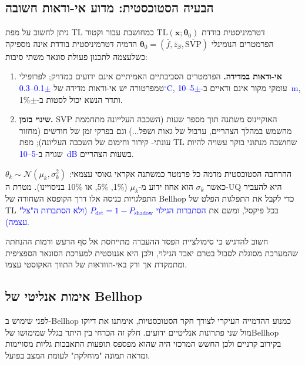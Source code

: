 \documentclass[12pt,a4paper]{article}
\newcommand{\TL}{\mathrm{TL}}
\newcommand{\Pshadow}{P_{\mathrm{shadow}}}
\DeclareRobustCommand{\aiedit}[1]{\textcolor{blue}{#1}}
\begin{document}
\subsection{הבעיה הסטוכסטית: מדוע אי-ודאות חשובה}
\label{sec:stochastic}

ניתן לחשוב על מפת TL דטרמיניסטית בודדת $\TL(\mathbf{x};\boldsymbol{\theta}_0)$ כמחושבת עבור
וקטור הפרמטרים הנומינלי $\boldsymbol{\theta}_0 = (\bar{f},\bar{z}_S, \overline{\mathrm{SVP}})$
הדמיה דטרמיניסטית בודדת אינה מספיקה כשלעצמה לתכנון פעולת סונאר משתי סיבות:

\begin{enumerate}
  \item \textbf{אי-ודאות במדידה.} הפרמטרים הסביבתיים האמיתיים אינם ידועים במדויק;
        לפרופילי טמפרטורה יש אי-ודאות מדידה של \aiedit{\textenglish{$\pm$0.1--0.3$^\circ$C}}, %
        עומקי מקור אינם ודאיים ב-\aiedit{\textenglish{$\pm$5--10~m}},%
        ותדר הנשא יכול לסטות ב-$\pm$1\%{}.
  \item \textbf{שינוי בזמן.} SVP האוקיינוס משתנה תוך מספר שעות
        (השכבה העלייונה מתחממת מהשמש במהלך הצהריים, ערבול של גאות ושפל...) וגם בפרקי זמן של חודשים (מחזור עונתי- קירור וחימום של השכבה העליונה);
        מפת TL שחושבה מנתוני בוקר עשויה להיות שגויה ב-\aiedit{\textenglish{5--10~dB}} בשעות הצהריים.%
\end{enumerate}

ההרחבה הסטוכסטית מדמה כל פרמטר כמשתנה אקראי גאוסי עצמאי:
$\theta_k \sim \mathcal{N}(\mu_k, \sigma_k^2)$ כאשר $\sigma_k$
הוא אחוז ידוע מ-$\mu_k$ (1\%{}, 5\%{}, או 10\%{} בניסויינו).
מטרת ה-\textenglish{UQ} היא להעביר התפלגויות כניסה אלו דרך הקופסא השחורה 
של \textenglish{Bellhop} כדי לקבל את התפלגות הפלט של TL בכל פיקסל,
ומשם את \aiedit{הסתברות הגילוי $P_\mathrm{det} = 1-\Pshadow$ (ולא הסתברות ה"צל" עצמה)}.%

חשוב להדגיש כי סימולציית הפסד ההעברה מתייחסת אל סף הרעש ורמות ההנחתה שהמערכת מסוגלת לסבול בטרם יאבד הגילוי,
ולכן היא אגנוסטית למערכת הסונאר הספציפית ומתמקדת אך ורק באי-הוודאות של התווך האקוסטי עצמו.

\subsection{אימות אנליטי של \textenglish{Bellhop}}
\label{sec:analytical_validation}

לפני שימוש ב-\textenglish{Bellhop} כמנוע ההדמייה העיקרי לצורך  חקר הסטוכסטיות, אימתנו את דיוקו
מול שני פתרונות אנליטיים ידועים. חלק זה הכרחי בין היתר בגלל שמימושו של\textenglish{Bellhop} בקירוב קרניים ולכן החשש המרכזי היה שהוא מפספס תופעות התאבכות גליות מסויימות ומראה תמונה "מוחלקת" לעומת המצב בפועל.
\end{document}
